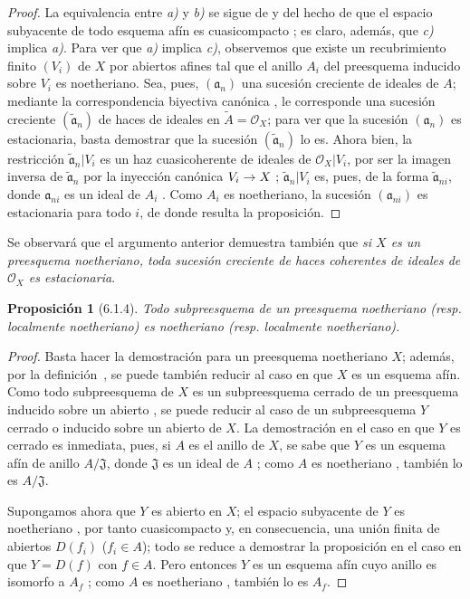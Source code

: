 \documentclass[oneside]{amsart}
\theoremstyle{ega-env-style}
\theoremstyle{ega-thm-env-style}
\newtheorem*{proposition}{Proposición}
\theoremstyle{ega-defn-env-style}
\renewcommand{\to}{\mathchoice{\longrightarrow}{\rightarrow}{\rightarrow}{\rightarrow}}
\newcommand{\oldpage}[2][]{{\marginnote{\normalfont{\textbf{#1}~|~#2}}}\ignorespaces}
\let\EGAOriginalLabel\label
\renewcommand{\label}[1]{\phantomsection\EGAOriginalLabel{#1}}
\begin{document}
\begin{proof}
La equivalencia entre \emph{a)} y \emph{b)} se sigue de  y del hecho de que el espacio subyacente de todo esquema afín es cuasicompacto ; es claro, además, que \emph{c)} implica \emph{a)}.
Para ver que \emph{a)} implica \emph{c)}, observemos que existe un recubrimiento finito $(V_i)$ de $X$ por abiertos afines tal que el anillo $A_i$ del preesquema inducido sobre $V_i$ es noetheriano.
Sea, pues, $(\mathfrak{a}_n)$ una sucesión creciente de ideales de $A$; mediante la correspondencia biyectiva canónica , le corresponde una sucesión creciente $(\widetilde{\mathfrak{a}}_n)$ de haces de ideales en $\widetilde{A}=\mathscr{O}_X$;
para ver que la sucesión $(\mathfrak{a}_n)$ es estacionaria, basta demostrar que la sucesión $(\widetilde{\mathfrak{a}}_n)$ lo es.
Ahora bien, la restricción $\widetilde{\mathfrak{a}}_n|V_i$ es un haz cuasicoherente de ideales de $\mathscr{O}_X|V_i$, por ser la imagen inversa de $\widetilde{\mathfrak{a}}_n$ por la inyección canónica $V_i\to X$ ;
$\widetilde{\mathfrak{a}}_n|V_i$ es, pues, de la forma $\widetilde{\mathfrak{a}}_{ni}$, donde $\mathfrak{a}_{ni}$ es un ideal de $A_i$ .
Como $A_i$ es noetheriano, la sucesión $(\mathfrak{a}_{ni})$ es estacionaria para todo $i$, de donde resulta la proposición.
\end{proof}

Se observará que el argumento anterior demuestra también que \emph{si $X$ es un preesquema noetheriano, toda sucesión creciente de haces coherentes de ideales de $\mathscr{O}_X$ es estacionaria}.

\begin{proposition}[6.1.4]
\label{I.6.1.4}
Todo subpreesquema de un preesquema noetheriano \textup{(resp.} localmente noetheriano) es noetheriano \textup{(resp.} localmente noetheriano).
\end{proposition}

\begin{proof}
Basta hacer la demostración para un preesquema noetheriano $X$;
además, por la definición~, se puede también reducir al caso en que $X$ es un esquema afín.
Como todo subpreesquema de $X$ es un subpreesquema cerrado de un preesquema inducido sobre un abierto , se puede reducir al caso de un subpreesquema $Y$ cerrado o inducido sobre un abierto de $X$.
La demostración en el caso en que $Y$ es cerrado es inmediata, pues, si $A$ es el anillo de $X$, se sabe que $Y$ es un esquema afín de anillo $A/\mathfrak{J}$, donde $\mathfrak{J}$ es un ideal de $A$ ;
como $A$ es noetheriano , también lo es $A/\mathfrak{J}$.

Supongamos ahora que $Y$ es abierto en $X$;
el espacio subyacente de $Y$ es noetheriano , por tanto cuasicompacto y, en consecuencia, una unión finita de abiertos $D(f_i)$ ($f_i\in A$);
\oldpage[I]{142}
todo se reduce a demostrar la proposición en el caso en que $Y=D(f)$ con $f\in A$.
Pero entonces $Y$ es un esquema afín cuyo anillo es isomorfo a $A_f$ ;
como $A$ es noetheriano , también lo es $A_f$.
\end{proof}
\end{document}
